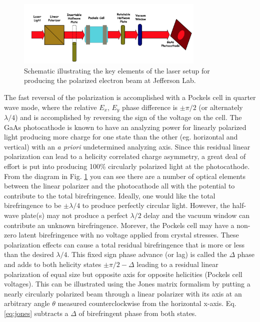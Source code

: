\documentclass[12pt]{article}
\begin{document}
\begin{figure}[hb]
\begin{center}
\includegraphics[width=0.8\textwidth]{laser_schematic.png}
\caption{\label{fig:laser_schematic} Schematic illustrating the key elements of the laser setup for producing the polarized electron beam at Jefferson Lab.}
\end{center}
\end{figure}
The fast reversal of the polarization is accomplished with a Pockels cell in quarter wave mode, where the relative $E_x$, $E_y$ phase difference is $\pm\pi/2$ (or alternately $\lambda/4$) and is accomplished by reversing the sign of the voltage on the cell. The GaAs photocathode is known to have an analyzing power for linearly polarized light producing more charge for one state than the other (eg. horizontal and vertical) with an {\it a priori} undetermined analyzing axis. Since this residual linear polarization can lead to a helicity correlated charge asymmetry, a great deal of effort is put into producing 100\% circularly polarized light at the photocathode. From the diagram in Fig. \ref{fig:laser_schematic} you can see there are a number of optical elements between the linear polarizer and the photocathode all with the potential to contribute to the total birefringence. Ideally, one would like the total birefringence to be $\pm\lambda/4$ to produce perfectly circular light. However, the half-wave plate(s) may not produce a perfect $\lambda/2$ delay and the vacuum window can contribute an unknown birefringence. Morever, the Pockels cell may have a non-zero latent birefringence with no voltage applied from crystal stresses. These polarization effects can cause a total residual birefringence that is more or less than the desired $\lambda/4$. This fixed sign phase advance (or lag) is called the $\Delta$ phase and adds to both helicity states $\pm\pi/2-\Delta$ leading to a residual linear polarization of equal size but opposite axis for opposite helicities (Pockels cell voltages). This can be illustrated using the Jones matrix formalism by putting a nearly circularly polarized beam through a linear polarizer with its axis at an arbitrary angle $\theta$ measured counterclockwise from the horizontal x-axis. Eq. \ref{eq:jones} subtracts a $\Delta$ of birefringent phase from both states.
\end{document}
